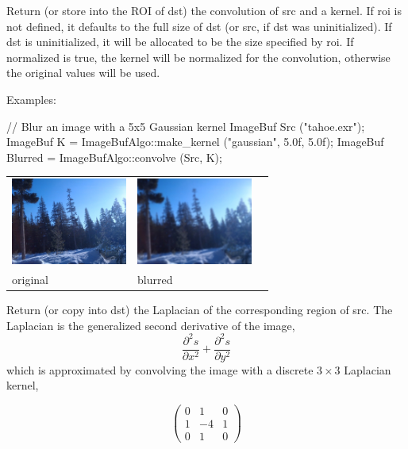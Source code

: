 Return (or store into the ROI of {\cf dst}) the convolution of {\cf src} and
a kernel.  If {\cf roi} is not defined, it defaults to the full size of
{\cf dst} (or {\cf src}, if {\cf dst} was uninitialized). If {\cf dst} is
uninitialized, it will be allocated to be the size specified by {\cf roi}.
If {\cf normalized} is {\cf true}, the kernel will be normalized for the
convolution, otherwise the original values will be used.

\smallskip
\noindent Examples:
\begin{code}
    // Blur an image with a 5x5 Gaussian kernel
    ImageBuf Src ("tahoe.exr");
    ImageBuf K = ImageBufAlgo::make_kernel ("gaussian", 5.0f, 5.0f);
    ImageBuf Blurred = ImageBufAlgo::convolve (Src, K);
\end{code}

\spc \begin{tabular}{lll}
\includegraphics[width=1.5in]{figures/tahoe-small.jpg} &
\includegraphics[width=1.5in]{figures/tahoe-blur.jpg} \\
original & blurred \\
\end{tabular}
\apiend


 
Return (or copy into {\cf dst}) the Laplacian of the corresponding
region of {\cf src}. The Laplacian is the generalized second derivative
of the image,
$$\frac{\partial^2 s}{\partial x^2} + \frac{\partial^2 s}{\partial y^2}$$
which is approximated by convolving the image with a discrete $3 \times 3$
Laplacian kernel,

\[ \left( \begin{array}{ccc}
0 &  1 & 0 \\
1 & -4 & 1 \\
0 &  1 & 0 \end{array} \right)\]

